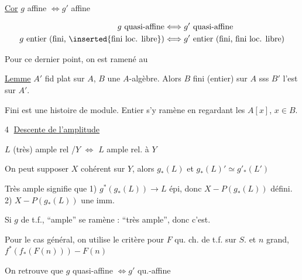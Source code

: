 \uline{Cor} $g$  affine $\Longleftrightarrow g'$ affine

\[
\begin{aligned}g\ \text{quasi-affine}&\Longleftrightarrow g'\ \text{quasi-affine}\\
 g\ \text{entier (fini, \inserted{fini loc. libre})}&\Longleftrightarrow g'\ \text{entier (fini, fini loc. libre)}
\end{aligned}
\]

\margin{[car $g$ qu. aff $\Longleftrightarrow g$ \unsure{qch|qu. cpt|coh.} et $X\mathrel{-}\operatorname{Spec}g_*(O_X)$ une imm}


Pour ce dernier point, on est ramené au

\uline{Lemme} $A'$ fid plat sur $A$, $B$ une $A$-algèbre. Alors $B$ fini (entier) sur $A$ sss $B'$ l'est sur $A'$.

Fini est une histoire de module. Entier s'y ramène en regardant les $A[x]$, $x\in B$.

\textcircled{4} \uline{Descente de l'amplitude}


\uline{$L$} (très) ample rel /$Y$ $\Longleftrightarrow$ $L$  ample rel. à $Y$

On peut supposer $X$ cohérent sur $Y$, alors $g_*(L)$  et $g_*(L)'\simeq g'_*(L')$

Très ample signifie que 1) $g^*(g_*(L))\longrightarrow L$ épi, donc $X\mathrel{-}P(g_*(L))$ défini.  2)  $X\mathrel{-}P(g_*(L))$ une imm.

Si $g$ de t.f., ``ample'' se ramène : ``très ample'', donc c'est.

Pour le cas général,  on utilise le critère  pour $F$ qu. ch. de t.f. sur $S$. et $n$ grand, $f^*(f_*(F(n)))\mathrel{-}F(n)$ 

On retrouve que $g$ quasi-affine $\Longleftrightarrow g'$ qu.-affine

